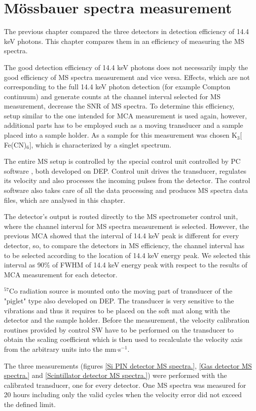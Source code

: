 \chapter{Mössbauer spectra measurement}
The previous chapter compared the three detectors in detection efficiency of 14.4 keV photons. This chapter compares them in an efficiency of measuring the MS spectra.
\par
The good detection efficiency of 14.4 keV photons does not necessarily imply the good efficiency of MS spectra measurement and vice versa. Effects, which are not corresponding to the full 14.4 keV photon detection (for example Compton continuum) and generate counts at the channel interval selected for MS measurement, decrease the SNR of MS spectra. To determine this efficiency, setup similar to the one intended for MCA measurement is used again, however, additional parts has to be employed such as a moving transducer and a sample placed into a sample holder. As a sample for this measurement was chosen K$_{3}[$Fe(CN)$_{6}]$, which is characterized by a singlet spectrum.
\par
The entire MS setup is controlled by the special control unit controlled by PC software \cite{MSControl}, both developed on DEP. Control unit drives the transducer, regulates its velocity and also processes the incoming pulses from the detector. The control software also takes care of all the data processing and produces MS spectra data files, which are analysed in this chapter.

\par
The detector's output is routed directly to the MS spectrometer control unit, where the channel interval for MS spectra measurement is selected. However, the previous MCA showed that the interval of 14.4 keV peak is different for every detector, so, to compare the detectors in MS efficiency, the channel interval  has to be selected according to the location of 14.4 keV energy peak. We selected this interval as 90$\%$ of FWHM of 14.4 keV energy peak with respect to the results of MCA measurement for each detector.
\par
$^{57}$Co radiation source is mounted onto the moving part of transducer of the "piglet" type also developed on DEP. The transducer is very sensitive to the vibrations and thus it requires to be placed on the soft mat along with the detector and the sample holder. Before the measurement, the velocity calibration routines provided by control SW have to be performed on the transducer to obtain the scaling coefficient which is then used to recalculate the velocity axis from the arbitrary units into the mm$\cdot$s$^{-1}$. 
\par
The three measurements (figures \ref{Si PIN detector MS spectra.}, \ref{Gas detector MS spectra.} and \ref{Scintillator detector MS spectra.}) were performed with the calibrated transducer, one for every detector. One MS spectra was measured for 20 hours including only the valid cycles when the velocity error did not exceed the defined limit.



